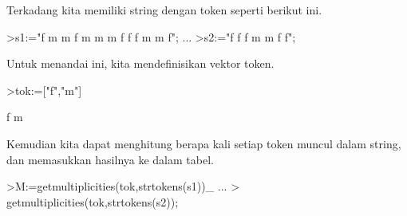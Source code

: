 \documentclass[a4paper,10pt]{article}
\begin{document}
\begin{eulernotebook}
\begin{eulercomment}
\begin{eulercomment}
\begin{eulercomment}
\begin{eulercomment}
\begin{eulercomment}
\begin{eulercomment}
\begin{eulercomment}
\begin{eulercomment}
\begin{eulercomment}
\begin{eulercomment}
\begin{eulercomment}
\begin{eulercomment}
\begin{eulercomment}
\begin{eulercomment}
\begin{eulercomment}
\begin{eulercomment}
\begin{eulercomment}
\begin{eulercomment}
\begin{eulercomment}
\begin{eulercomment}
\begin{eulercomment}
\begin{eulercomment}
\begin{eulercomment}
\begin{eulercomment}
\begin{eulercomment}
\begin{eulercomment}
\begin{eulercomment}
\begin{eulercomment}
\begin{eulercomment}
\begin{eulercomment}
\begin{eulercomment}
\begin{eulercomment}
\begin{eulercomment}
\begin{eulercomment}
\begin{eulercomment}
\begin{eulercomment}
\begin{eulercomment}
\begin{eulercomment}
\begin{eulercomment}
\begin{eulercomment}
\begin{eulercomment}
\begin{eulercomment}
\begin{eulercomment}
\begin{eulercomment}
\begin{eulercomment}
\begin{eulercomment}
\begin{eulercomment}
\begin{eulercomment}
\begin{eulercomment}
\begin{eulercomment}
\begin{eulerprompt}
\end{eulerprompt}
\begin{eulercomment}
Terkadang kita memiliki string dengan token seperti berikut ini.
\end{eulercomment}
\begin{eulerprompt}
>s1:="f m m f m m m f f f m m f";  ...
>s2:="f f f m m f f";
\end{eulerprompt}
\begin{eulercomment}
Untuk menandai ini, kita mendefinisikan vektor token.
\end{eulercomment}
\begin{eulerprompt}
>tok:=["f","m"]
\end{eulerprompt}
\begin{euleroutput}
  f
  m
\end{euleroutput}
\begin{eulercomment}
Kemudian kita dapat menghitung berapa kali setiap token muncul dalam
string, dan memasukkan hasilnya ke dalam tabel.
\end{eulercomment}
\begin{eulerprompt}
>M:=getmultiplicities(tok,strtokens(s1))_ ...
>  getmultiplicities(tok,strtokens(s2));
\end{eulerprompt}

\end{eulercomment}
\end{eulercomment}
\end{eulercomment}
\end{eulercomment}
\end{eulercomment}
\end{eulercomment}
\end{eulercomment}
\end{eulercomment}
\end{eulercomment}
\end{eulercomment}
\end{eulercomment}
\end{eulercomment}
\end{eulercomment}
\end{eulercomment}
\end{eulercomment}
\end{eulercomment}
\end{eulercomment}
\end{eulercomment}
\end{eulercomment}
\end{eulercomment}
\end{eulercomment}
\end{eulercomment}
\end{eulercomment}
\end{eulercomment}
\end{eulercomment}
\end{eulercomment}
\end{eulercomment}
\end{eulercomment}
\end{eulercomment}
\end{eulercomment}
\end{eulercomment}
\end{eulercomment}
\end{eulercomment}
\end{eulercomment}
\end{eulercomment}
\end{eulercomment}
\end{eulercomment}
\end{eulercomment}
\end{eulercomment}
\end{eulercomment}
\end{eulercomment}
\end{eulercomment}
\end{eulercomment}
\end{eulercomment}
\end{eulercomment}
\end{eulercomment}
\end{eulercomment}
\end{eulercomment}
\end{eulercomment}
\end{eulercomment}
\end{eulernotebook}
\end{document}

